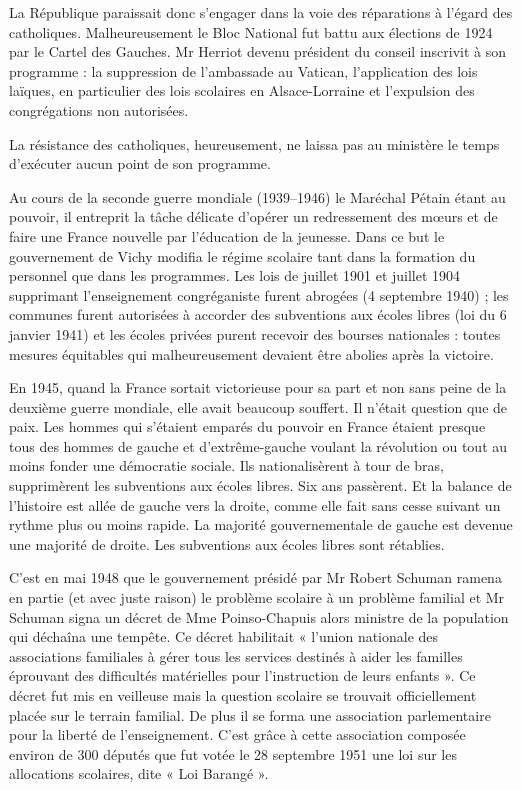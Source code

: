 La République paraissait donc s'engager dans la voie des réparations à l'égard des catholiques. Malheureusement le Bloc National fut battu aux élections de 1924 par le Cartel des Gauches. Mr Herriot devenu président du conseil inscrivit à son programme : la suppression de l'ambassade au Vatican, l'application des lois laïques, en particulier des lois scolaires en Alsace-Lorraine et l'expulsion des congrégations non autorisées.

La résistance des catholiques, heureusement, ne laissa pas au ministère le temps d'exécuter aucun point de son programme.

Au cours de la seconde guerre mondiale (1939--1946) le Maréchal Pétain étant au pouvoir, il entreprit la tâche délicate d'opérer un redressement des mœurs et de faire une France nouvelle par l'éducation de la jeunesse. Dans ce but le gouvernement de Vichy modifia le régime scolaire tant dans la formation du personnel que dans les programmes. Les lois de juillet 1901 et juillet 1904 supprimant l'enseignement congréganiste furent abrogées (4 septembre 1940) ; les communes furent autorisées à accorder des subventions aux écoles libres (loi du 6 janvier 1941) et les écoles privées purent recevoir des bourses nationales : toutes mesures équitables qui malheureusement devaient être abolies après la victoire.

En 1945, quand la France sortait victorieuse pour sa part et non sans peine de la deuxième guerre mondiale, elle avait beaucoup souffert. Il n'était question que de paix. Les hommes qui s'étaient emparés du pouvoir en France étaient presque tous des hommes de gauche et d'extrême-gauche voulant la révolution ou tout au moins fonder une démocratie sociale. Ils nationalisèrent à tour de bras, supprimèrent les subventions aux écoles libres. Six ans passèrent. Et la balance de l'histoire est allée de gauche vers la droite, comme elle fait sans cesse suivant un rythme plus ou moins rapide. La majorité gouvernementale de gauche est devenue une majorité de droite. Les subventions aux écoles libres sont rétablies.

C'est en mai 1948 que le gouvernement présidé par Mr Robert Schuman ramena en partie (et avec juste raison) le problème scolaire à un problème familial et Mr Schuman signa un décret de Mme Poinso-Chapuis alors ministre de la population qui déchaîna une tempête. Ce décret habilitait « l'union nationale des associations familiales à gérer tous les services destinés à aider les familles éprouvant des difficultés
matérielles pour l'instruction de leurs enfants ». Ce décret fut mis en veilleuse mais la question scolaire se trouvait officiellement placée sur le terrain familial. De plus il se forma une association parlementaire pour la liberté de l'enseignement. C'est grâce à cette association composée environ de 300 députés que fut votée le 28 septembre 1951 une loi sur les allocations scolaires, dite « Loi Barangé ».

